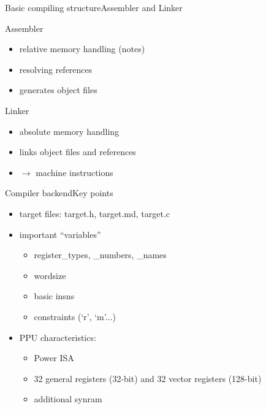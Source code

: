 \documentclass[10pt]{beamer}
\begin{document}
\begin{frame}{Basic compiling structure}{Assembler and Linker}
    \begin{block}{Assembler}
       	\begin{itemize}
		\item relative memory handling (notes)
		\item resolving references
		\item generates object files
       	\end{itemize}
    \end{block}
    \begin{block}{Linker}
	\begin{itemize}
       		\item absolute memory handling
       		\item links object files and references
       		\item $\rightarrow$ machine instructions
       	\end{itemize}
    \end{block}
\end{frame}

\begin{frame}[fragile]{Compiler backend}{Key points}
	\begin{itemize}
		\item target files: target.h, target.md, target.c
		\item important ``variables''
			\begin{itemize}
				\item register\_types, \_numbers, \_names
				\item wordsize
				\item basic insns
				\item constraints (`r', `m'...)
			\end{itemize}
		\item PPU characteristics:
			\begin{itemize}
				\item Power ISA
				\item 32 general registers (32-bit) and 32 vector registers (128-bit)
				\item additional synram
			\end{itemize}
 	\end{itemize}
\end{frame}
\end{document}
